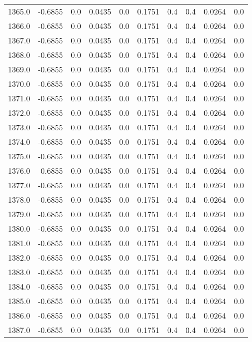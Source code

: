 \begin{longtable}{lrrrrrrrrr}
1365.0 & -0.6855 & 0.0 & 0.0435 & 0.0 & 0.1751 & 0.4 & 0.4 & 0.0264 & 0.0 \\
1366.0 & -0.6855 & 0.0 & 0.0435 & 0.0 & 0.1751 & 0.4 & 0.4 & 0.0264 & 0.0 \\
1367.0 & -0.6855 & 0.0 & 0.0435 & 0.0 & 0.1751 & 0.4 & 0.4 & 0.0264 & 0.0 \\
1368.0 & -0.6855 & 0.0 & 0.0435 & 0.0 & 0.1751 & 0.4 & 0.4 & 0.0264 & 0.0 \\
1369.0 & -0.6855 & 0.0 & 0.0435 & 0.0 & 0.1751 & 0.4 & 0.4 & 0.0264 & 0.0 \\
1370.0 & -0.6855 & 0.0 & 0.0435 & 0.0 & 0.1751 & 0.4 & 0.4 & 0.0264 & 0.0 \\
1371.0 & -0.6855 & 0.0 & 0.0435 & 0.0 & 0.1751 & 0.4 & 0.4 & 0.0264 & 0.0 \\
1372.0 & -0.6855 & 0.0 & 0.0435 & 0.0 & 0.1751 & 0.4 & 0.4 & 0.0264 & 0.0 \\
1373.0 & -0.6855 & 0.0 & 0.0435 & 0.0 & 0.1751 & 0.4 & 0.4 & 0.0264 & 0.0 \\
1374.0 & -0.6855 & 0.0 & 0.0435 & 0.0 & 0.1751 & 0.4 & 0.4 & 0.0264 & 0.0 \\
1375.0 & -0.6855 & 0.0 & 0.0435 & 0.0 & 0.1751 & 0.4 & 0.4 & 0.0264 & 0.0 \\
1376.0 & -0.6855 & 0.0 & 0.0435 & 0.0 & 0.1751 & 0.4 & 0.4 & 0.0264 & 0.0 \\
1377.0 & -0.6855 & 0.0 & 0.0435 & 0.0 & 0.1751 & 0.4 & 0.4 & 0.0264 & 0.0 \\
1378.0 & -0.6855 & 0.0 & 0.0435 & 0.0 & 0.1751 & 0.4 & 0.4 & 0.0264 & 0.0 \\
1379.0 & -0.6855 & 0.0 & 0.0435 & 0.0 & 0.1751 & 0.4 & 0.4 & 0.0264 & 0.0 \\
1380.0 & -0.6855 & 0.0 & 0.0435 & 0.0 & 0.1751 & 0.4 & 0.4 & 0.0264 & 0.0 \\
1381.0 & -0.6855 & 0.0 & 0.0435 & 0.0 & 0.1751 & 0.4 & 0.4 & 0.0264 & 0.0 \\
1382.0 & -0.6855 & 0.0 & 0.0435 & 0.0 & 0.1751 & 0.4 & 0.4 & 0.0264 & 0.0 \\
1383.0 & -0.6855 & 0.0 & 0.0435 & 0.0 & 0.1751 & 0.4 & 0.4 & 0.0264 & 0.0 \\
1384.0 & -0.6855 & 0.0 & 0.0435 & 0.0 & 0.1751 & 0.4 & 0.4 & 0.0264 & 0.0 \\
1385.0 & -0.6855 & 0.0 & 0.0435 & 0.0 & 0.1751 & 0.4 & 0.4 & 0.0264 & 0.0 \\
1386.0 & -0.6855 & 0.0 & 0.0435 & 0.0 & 0.1751 & 0.4 & 0.4 & 0.0264 & 0.0 \\
1387.0 & -0.6855 & 0.0 & 0.0435 & 0.0 & 0.1751 & 0.4 & 0.4 & 0.0264 & 0.0 \\

\end{longtable}

